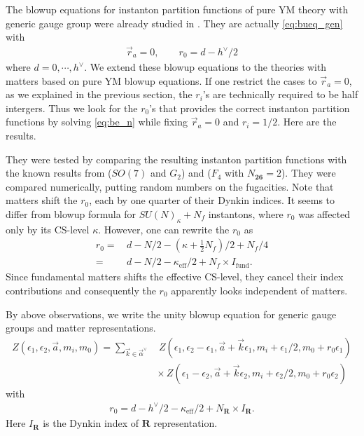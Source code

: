 \documentclass[letterpaper, 11pt]{article}
\begin{document}
{The blowup equations for instanton partition functions of pure YM theory with generic gauge group were already studied in \cite{Keller:2012da}. They are actually \eqref{eq:bueq_gen} with 
\begin{align}
\vec{r}_a=0,\qquad r_0=d-h^{\lor}/2
\end{align}
where $d=0,\cdots, h^{\lor}$. We extend these blowup equations to the theories with matters based on pure YM blowup equations. If one restrict the cases to $\vec{r}_a=0$, as we explained in the previous section, the $r_i$'s are technically required to be half intergers. Thus we look for the $r_0$'s that provides the correct instanton partition functions by solving \eqref{eq:be_n} while fixing $\vec{r}_a=0$ and $r_i=1/2$. Here are the results.



They were tested by comparing the resulting instanton partition functions with the known results from \cite{Kim:2018gjo}($SO(7)$ and $G_2$) and \cite{DelZotto:2018tcj}($F_4$ with $N_{\boldsymbol{26}}=2$). They were compared numerically, putting random numbers on the fugacities.
Note that matters shift the $r_0$, each by one quarter of their Dynkin indices. It seems to differ from blowup formula for $SU(N)_\kappa+N_f$ instantons, where $r_0$ was affected only by its CS-level $\kappa$. However, one can rewrite the $r_0$ as
\begin{align}
r_0=&\,d-N/2-\left(\kappa+\frac{1}{2}N_f\right)/2+N_f/4\nonumber\\
=&\,d-N/2-\kappa_{\textrm{eff}}/2+N_f\times I_{\textrm{fund}}.
\end{align}
Since fundamental matters shifts the effective CS-level, they cancel their index contributions and consequently the $r_0$ apparently looks independent of matters. 

By above observations, we write the unity blowup equation for generic gauge groups and matter representations.
\begin{align}
Z(\epsilon_1,\epsilon_2,\vec{a},m_i,m_0)=\sum_{\vec{k}\in\vec{\alpha}^{\lor}}&\,Z(\epsilon_1,\epsilon_2-\epsilon_1,\vec{a}+\vec{k}\epsilon_1,m_i+\epsilon_1/2,m_0+r_0\epsilon_1)\nonumber\\
&\times\,Z(\epsilon_1-\epsilon_2,\vec{a}+\vec{k}\epsilon_2,m_i+\epsilon_2/2,m_0+r_0\epsilon_2)
\end{align}
with 
\begin{align}
r_0=d-h^{\lor}/2-\kappa_{\textrm{eff}}/2+N_{\boldsymbol{R}}\times I_{\boldsymbol{R}}.
\end{align}
Here $I_{\boldsymbol{R}}$ is the Dynkin index of $\boldsymbol{R}$ representation.

}
\end{document}
